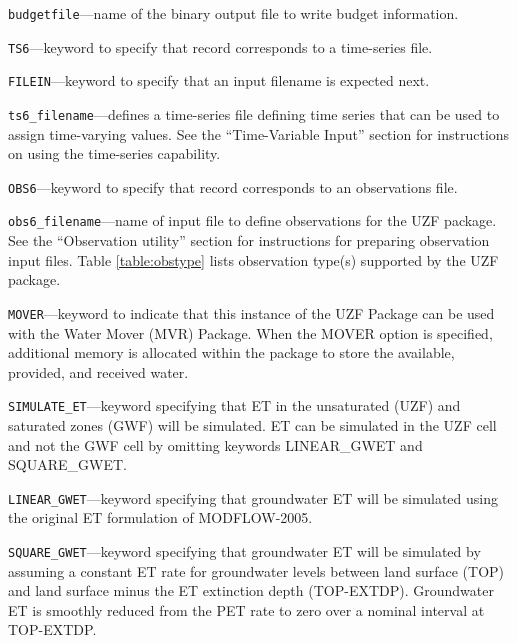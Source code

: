 \begin{description}
\item \texttt{budgetfile}---name of the binary output file to write budget information.

\item \texttt{TS6}---keyword to specify that record corresponds to a time-series file.

\item \texttt{FILEIN}---keyword to specify that an input filename is expected next.

\item \texttt{ts6\_filename}---defines a time-series file defining time series that can be used to assign time-varying values. See the ``Time-Variable Input'' section for instructions on using the time-series capability.

\item \texttt{OBS6}---keyword to specify that record corresponds to an observations file.

\item \texttt{obs6\_filename}---name of input file to define observations for the UZF package. See the ``Observation utility'' section for instructions for preparing observation input files. Table \ref{table:obstype} lists observation type(s) supported by the UZF package.

\item \texttt{MOVER}---keyword to indicate that this instance of the UZF Package can be used with the Water Mover (MVR) Package.  When the MOVER option is specified, additional memory is allocated within the package to store the available, provided, and received water.

\item \texttt{SIMULATE\_ET}---keyword specifying that ET in the unsaturated (UZF) and saturated zones (GWF) will be simulated. ET can be simulated in the UZF cell and not the GWF cell by omitting keywords LINEAR\_GWET and SQUARE\_GWET.

\item \texttt{LINEAR\_GWET}---keyword specifying that groundwater ET will be simulated using the original ET formulation of MODFLOW-2005.

\item \texttt{SQUARE\_GWET}---keyword specifying that groundwater ET will be simulated by assuming a constant ET rate for groundwater levels between land surface (TOP) and land surface minus the ET extinction depth (TOP-EXTDP). Groundwater ET is smoothly reduced from the PET rate to zero over a nominal interval at TOP-EXTDP.


\end{description}
